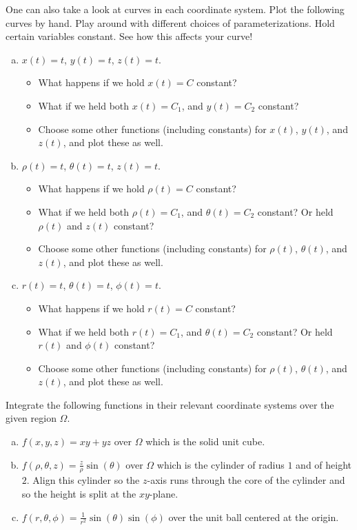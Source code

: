 \documentclass[12pt]{article} %
\begin{document}
\vspace*{1cm}
\begin{problem}
One can also take a look at curves in each coordinate system.  Plot the following curves by hand. Play around with different choices of parameterizations. Hold certain variables constant. See how this affects your curve!
\begin{enumerate}[(a)]
    \item $x(t)=t$, $y(t)=t$, $z(t)=t$.
    \begin{itemize}
        \item What happens if we hold $x(t)=C$ constant? 
        \item What if we held both $x(t)=C_1$, and $y(t)=C_2$ constant?
        \item Choose some other functions (including constants) for $x(t)$, $y(t)$, and $z(t)$, and plot these as well.
    \end{itemize}
    \item $\rho(t)=t$, $\theta(t)=t$, $z(t)=t$.
    \begin{itemize}
        \item What happens if we hold $\rho(t)=C$ constant? 
        \item What if we held both $\rho(t)=C_1$, and $\theta(t)=C_2$ constant? Or held $\rho(t)$ and $z(t)$ constant?
        \item Choose some other functions (including constants) for $\rho(t)$, $\theta(t)$, and $z(t)$, and plot these as well.
    \end{itemize}
    \item $r(t)=t$, $\theta(t)=t$, $\phi(t)=t$.
    \begin{itemize}
        \item What happens if we hold $r(t)=C$ constant? 
        \item What if we held both $r(t)=C_1$, and $\theta(t)=C_2$ constant? Or held $r(t)$ and $\phi(t)$ constant?
        \item Choose some other functions (including constants) for $\rho(t)$, $\theta(t)$, and $z(t)$, and plot these as well.
    \end{itemize}
\end{enumerate}
\end{problem}

\vspace*{1cm}
\begin{problem}
Integrate the following functions in their relevant coordinate systems over the given region $\Omega$.
\begin{enumerate}[(a)]
    \item $f(x,y,z) = xy+yz$ over $\Omega$ which is the solid unit cube.
    \item $f(\rho,\theta,z) = \frac{z}{\rho}\sin(\theta)$ over $\Omega$ which is the cylinder of radius $1$ and of height $2$. Align this cylinder so the $z$-axis runs through the core of the cylinder and so the height is split at the $xy$-plane.
    \item $f(r,\theta,\phi) = \frac{1}{r^2}\sin(\theta)\sin(\phi)$ over the unit ball centered at the origin.
\end{enumerate}
\end{problem}
\end{document}

